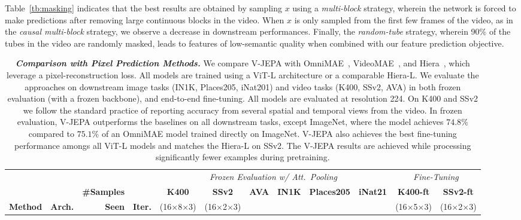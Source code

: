 \documentclass[twocolumn]{fairmeta}
\newcommand{\putalg}{{\small V-JEPA}\xspace}
\theoremstyle{plain}
\theoremstyle{definition}
\theoremstyle{remark}
\begin{document}
Table~\ref{tb:masking} indicates that the best results are obtained by sampling $x$ using a {\it multi-block} strategy, wherein the network is forced to make predictions after removing large continuous blocks in the video.
When $x$ is only sampled from the first few frames of the video, as in the {\it causal multi-block} strategy, we observe a decrease in downstream performances.
Finally, the {\it random-tube} strategy, wherein  90\% of the tubes in the video are randomly masked, leads to features of low-semantic quality when combined with our feature prediction objective. 

\begin{table}[t]
    \centering
    {\fontsize{7pt}{7pt}\selectfont
    \caption{{\bf \it Comparison with Pixel Prediction Methods.} We compare \putalg with OmniMAE~\citep{girdhar2023omnimae}, VideoMAE~\citep{tong2022videomae}, and Hiera~\citep{ryali2023hiera}, which leverage a pixel-reconstruction loss.
    All models are trained using a ViT-L architecture or a comparable Hiera-L.
    We evaluate the approaches on downstream image tasks (IN1K, Places205, iNat201) and video tasks (K400, SSv2, AVA) in both frozen evaluation (with a frozen backbone), and end-to-end fine-tuning.
    All models are evaluated at resolution 224.
    On K400 and SSv2 we follow the standard practice of reporting accuracy from several spatial and temporal views from the video. 
    In frozen evaluation, \putalg outperforms the baselines on all downstream tasks, except ImageNet, where the model achieves $74.8\%$ compared to $75.1\%$ of an OmniMAE model trained directly on ImageNet.
    \putalg also achieves the best fine-tuning performance amongs all ViT-L models and matches the Hiera-L on SSv2.
    The \putalg results are achieved while processing significantly fewer examples during pretraining.
    }
    \label{tb:pixel_comparison}
    \begin{tabular}{llrr cccccc cc}
    \toprule
    & & & & \multicolumn{6}{c}{ \it Frozen Evaluation w/ Att.~Pooling} & \multicolumn{2}{c}{\it Fine-Tuning} \\
    \cmidrule(l){5-10} \cmidrule(l){11-12}
    & & \bf \#Samples & & \bf K400 & \bf SSv2 & \bf AVA & \bf IN1K & \bf Places205 & \bf iNat21 & \bf K400-ft & \bf SSv2-ft \\
    \bf Method & \bf Arch. & \bf Seen & \bf Iter. & {\fontsize{5.5pt}{5.5pt}\selectfont(16$\times$8$\times$3)} & {\fontsize{5.5pt}{5.5pt}\selectfont(16$\times$2$\times$3)} & & & & & {\fontsize{5.5pt}{5.5pt}\selectfont(16$\times$5$\times$3)} & {\fontsize{5.5pt}{5.5pt}\selectfont(16$\times$2$\times$3)}\\

\end{tabular}}
\end{table}
\end{document}
